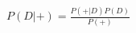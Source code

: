 \documentclass[preview]{standalone}
\begin{document}
\begin{align*}
P(D|+) = \frac{P(+|D)P(D)}{P(+)}
\end{align*}
\end{document}
